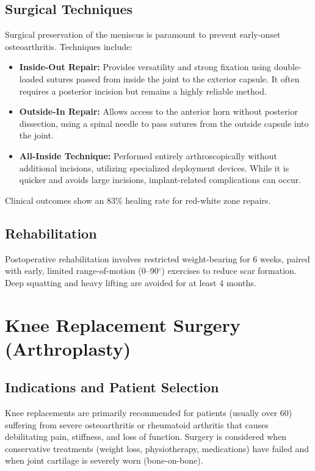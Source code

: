 \documentclass[12pt,a4paper]{article}
\begin{document}
\subsection{Surgical Techniques}
Surgical preservation of the meniscus is paramount to prevent early-onset osteoarthritis. Techniques include:
\begin{itemize}
    \item \textbf{Inside-Out Repair:} Provides versatility and strong fixation using double-loaded sutures passed from inside the joint to the exterior capsule. It often requires a posterior incision but remains a highly reliable method.
    \item \textbf{Outside-In Repair:} Allows access to the anterior horn without posterior dissection, using a spinal needle to pass sutures from the outside capsule into the joint.
    \item \textbf{All-Inside Technique:} Performed entirely arthroscopically without additional incisions, utilizing specialized deployment devices. While it is quicker and avoids large incisions, implant-related complications can occur.
\end{itemize}
Clinical outcomes show an 83\% healing rate for red-white zone repairs.

\subsection{Rehabilitation}
Postoperative rehabilitation involves restricted weight-bearing for 6 weeks, paired with early, limited range-of-motion (0--90$^\circ$) exercises to reduce scar formation. Deep squatting and heavy lifting are avoided for at least 4 months.

\section{Knee Replacement Surgery (Arthroplasty)}
\subsection{Indications and Patient Selection}
Knee replacements are primarily recommended for patients (usually over 60) suffering from severe osteoarthritis or rheumatoid arthritis that causes debilitating pain, stiffness, and loss of function. Surgery is considered when conservative treatments (weight loss, physiotherapy, medications) have failed and when joint cartilage is severely worn (bone-on-bone).
\end{document}

